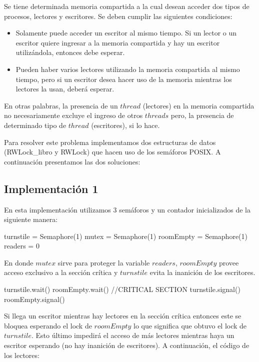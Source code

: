 Se tiene determinada memoria compartida a la cual desean acceder dos tipos de procesos, lectores y escritores. Se deben cumplir las siguientes condiciones:
\begin{itemize}
	\item Solamente puede acceder un escritor al mismo tiempo. Si un lector o un escritor quiere ingresar a la memoria compartida y hay un escritor utilizándola, entonces debe esperar.
	\item Pueden haber varios lectores utilizando la memoria compartida al mismo tiempo, pero si un escritor desea hacer uso de la memoria mientras los lectores la usan, deberá esperar.
\end{itemize}

En otras palabras, la presencia de un $thread$ (lectores) en la memoria compartida no necesariamente excluye el ingreso de otros $threads$ pero, la presencia de determinado tipo de $thread$ (escritores), si lo hace.

Para resolver este problema implementamos dos estructuras de datos (RWLock\_libro y RWLock) que hacen uso de los semáforos POSIX. A continuación presentamos las dos soluciones:

\subsection{Implementación 1} 

En esta implementación utilizamos 3 semáforos y un contador inicializados de la siguiente manera:

\begin{algorithmic}
	\State turnstile = Semaphore(1)
	\State mutex = Semaphore(1)
	\State roomEmpty = Semaphore(1)
	\State readers = 0
  \EndFunction
\end{algorithmic}

En donde $mutex$ sirve para proteger la variable $readers$, $roomEmpty$ provee acceso exclusivo a la sección crítica y $turnstile$ evita la inanición de los escritores.

\begin{algorithmic}
	\State turnstile.wait()
	\State roomEmpty.wait()
	\State //CRITICAL SECTION
	\State turnstile.signal()
	\State roomEmpty.signal()
  \EndFunction
\end{algorithmic}

Si llega un escritor mientras hay lectores en la sección crítica entonces este se bloquea esperando el lock de $roomEmpty$ lo que significa que obtuvo el lock de $turnstile$. Esto último impedirá el acceso de más lectores mientras haya un escritor esperando (no hay inanición de escritores). A continuación, el código de los lectores:

